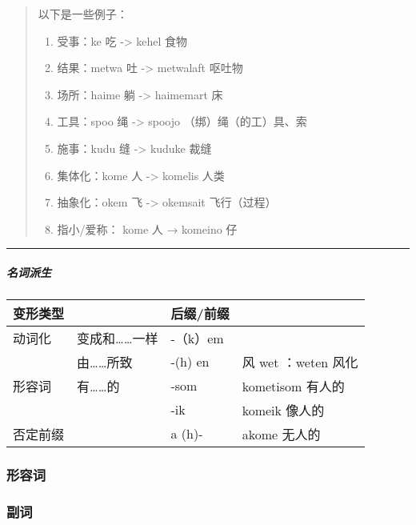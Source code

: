 \documentclass{article}
\begin{document}
\begin{quote}
以下是一些例子：

\begin{enumerate}
\def\labelenumi{\arabic{enumi}.}
\item
  受事：ke 吃 -\textgreater{} kehel 食物
\item
  结果：metwa 吐 -\textgreater{} metwalaft 呕吐物
\item
  场所：haime 躺 -\textgreater{} haimemart 床
\item
  工具：spoo 绳 -\textgreater{} spoojo （绑）绳（的工）具、索
\item
  施事：kudu 缝 -\textgreater{} kuduke 裁缝
\item
  集体化：kome 人 -\textgreater{} komelis 人类
\item
  抽象化：okem 飞 -\textgreater{} okemsait 飞行（过程）
\item
  指小/爱称： kome 人 → komeino 仔
\end{enumerate}
\end{quote}

\begin{center}\rule{0.5\linewidth}{0.5pt}\end{center}

\subparagraph{名词派生}\label{ux540dux8bcdux6d3eux751f}

\begin{longtable}[]{@{}llll@{}}
\toprule\noalign{}
变形类型 & & 后缀/前缀 & \\
\midrule\noalign{}
\endhead
\bottomrule\noalign{}
\endlastfoot
动词化 & 变成和\ldots\ldots 一样 & -（k）em & \\
& 由\ldots\ldots 所致 & -(h) en & 风 wet ：weten 风化 \\
形容词 & 有\ldots\ldots 的 & -som & kometisom 有人的 \\
& & -ik & komeik 像人的 \\
否定前缀 & & a (h)- & akome 无人的 \\
\end{longtable}

\subsubsection{形容词}\label{ux5f62ux5bb9ux8bcd}

\subsubsection{副词}\label{ux526fux8bcd}
\end{document}
